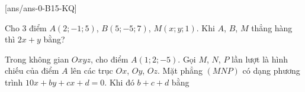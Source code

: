 
[ans/ans-0-B15-KQ]
\caukq
\begin{ex}%
	Cho 3 điểm $A(2;-1;5)$, $B(5;-5;7)$, $M(x;y;1)$. Khi $A$, $B$, $M$ thẳng hàng thì $2x+y$ bằng?
\end{ex}
\begin{ex}%
	Trong không gian $Oxyz$, cho điểm $A(1;2;-5)$. Gọi $M$, $N$, $P$ lần lượt là hình chiếu của điểm $A$ lên các trục $Ox$, $Oy$, $Oz$. Mặt phẳng $(MNP)$ có dạng phương trình $10x+by+cx+d=0$. Khi đó $b+c+d$ bằng
\end{ex}
